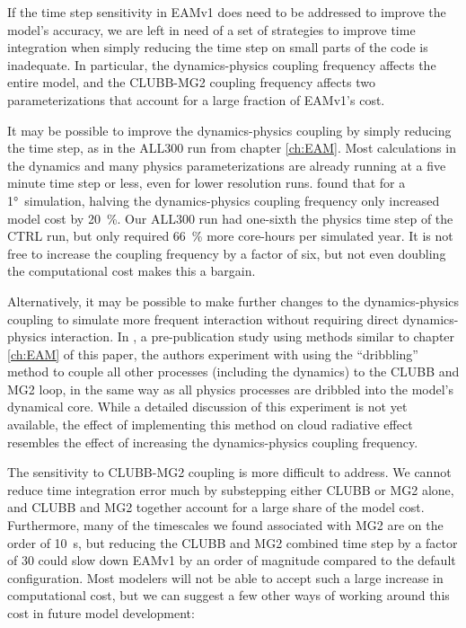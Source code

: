 \documentclass [11pt, proquest] {uwthesis}[2020/02/24]
\begin{document}
If the time step sensitivity in EAMv1 does need to be addressed to improve the model's accuracy, we are left in need of a set of strategies to improve time integration when simply reducing the time step on small parts of the code is inadequate. In particular, the dynamics-physics coupling frequency affects the entire model, and the CLUBB-MG2 coupling frequency affects two parameterizations that account for a large fraction of EAMv1's cost.

It may be possible to improve the dynamics-physics coupling by simply reducing the time step, as in the ALL300 run from chapter \ref{ch:EAM}. Most calculations in the dynamics and many physics parameterizations are already running at a five minute time step or less, even for lower resolution runs. \textcite{Donahue2020} found that for a \ang{1}~simulation, halving the dynamics-physics coupling frequency only increased model cost by \SI{20}{\percent}. Our ALL300 run had one-sixth the physics time step of the CTRL run, but only required \SI{66}{\percent} more core-hours per simulated year. It is not free to increase the coupling frequency by a factor of six, but not even doubling the computational cost makes this a bargain.

Alternatively, it may be possible to make further changes to the dynamics-physics coupling to simulate more frequent interaction without requiring direct dynamics-physics interaction. In \textcite{Wan2020}, a pre-publication study using methods similar to chapter \ref{ch:EAM} of this paper, the authors experiment with using the ``dribbling'' method to couple all other processes (including the dynamics) to the CLUBB and MG2 loop, in the same way as all physics processes are dribbled into the model's dynamical core. While a detailed discussion of this experiment is not yet available, the effect of implementing this method on cloud radiative effect resembles the effect of increasing the dynamics-physics coupling frequency.

The sensitivity to CLUBB-MG2 coupling is more difficult to address. We cannot reduce time integration error much by substepping either CLUBB or MG2 alone, and CLUBB and MG2 together account for a large share of the model cost. Furthermore, many of the timescales we found associated with MG2 are on the order of \SI{10}{\second}, but reducing the CLUBB and MG2 combined time step by a factor of \num{30} could slow down EAMv1 by an order of magnitude compared to the default configuration. Most modelers will not be able to accept such a large increase in computational cost, but we can suggest a few other ways of working around this cost in future model development:
\end{document}
